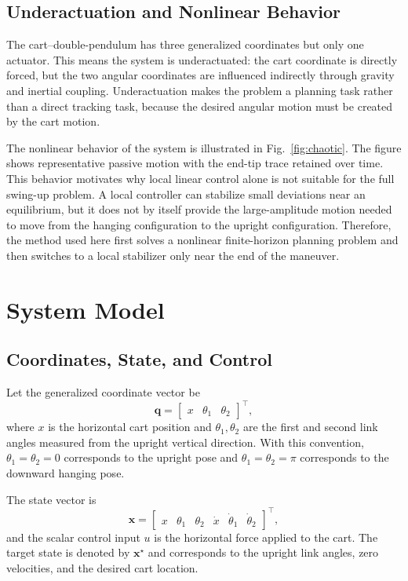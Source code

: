 \documentclass[conference]{IEEEtran}
\begin{document}
\subsection{Underactuation and Nonlinear Behavior}
The cart--double-pendulum has three generalized coordinates but only one actuator. This means the system is underactuated: the cart coordinate is directly forced, but the two angular coordinates are influenced indirectly through gravity and inertial coupling. Underactuation makes the problem a planning task rather than a direct tracking task, because the desired angular motion must be created by the cart motion.

The nonlinear behavior of the system is illustrated in Fig.~\ref{fig:chaotic}. The figure shows representative passive motion with the end-tip trace retained over time. This behavior motivates why local linear control alone is not suitable for the full swing-up problem. A local controller can stabilize small deviations near an equilibrium, but it does not by itself provide the large-amplitude motion needed to move from the hanging configuration to the upright configuration. Therefore, the method used here first solves a nonlinear finite-horizon planning problem and then switches to a local stabilizer only near the end of the maneuver.

\section{System Model}
\subsection{Coordinates, State, and Control}
Let the generalized coordinate vector be
\begin{equation}
\bm{q}=\begin{bmatrix}x&\theta_1&\theta_2\end{bmatrix}^{\top},
\end{equation}
where $x$ is the horizontal cart position and $\theta_1,\theta_2$ are the first and second link angles measured from the upright vertical direction. With this convention, $\theta_1=\theta_2=0$ corresponds to the upright pose and $\theta_1=\theta_2=\pi$ corresponds to the downward hanging pose.

The state vector is
\begin{equation}
\bm{x}
=
\begin{bmatrix}
x & \theta_1 & \theta_2 & \dot{x} & \dot{\theta}_1 & \dot{\theta}_2
\end{bmatrix}^{\top},
\end{equation}
and the scalar control input $u$ is the horizontal force applied to the cart. The target state is denoted by $\bm{x}^{\star}$ and corresponds to the upright link angles, zero velocities, and the desired cart location.
\end{document}
